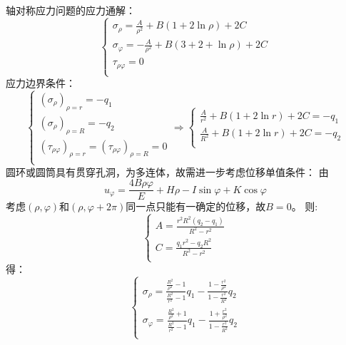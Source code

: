 	\begin{remark}
		轴对称应力问题的应力通解：
		\begin{equation*}
			\begin{cases}
			\sigma _{\rho}=\frac{A}{\rho ^2}+B\left( 1+2\ln \rho \right) +2C\\
			\sigma _{\varphi}=-\frac{A}{\rho ^2}+B\left( 3+2+\ln \rho \right) +2C\\
			\tau _{\rho \varphi}=0\\
			\end{cases}
		\end{equation*}
		应力边界条件：
		\begin{equation*}
			\begin{cases}
			\left( \sigma _{\rho} \right) _{\rho =r}=-q_1\\
			\left( \sigma _{\rho} \right) _{\rho =R}=-q_2\\
			\left( \tau _{\rho \varphi} \right) _{\rho =r}=\left( \tau _{\rho \varphi} \right) _{\rho =R}=0\\
			\end{cases}\Longrightarrow \left\{ \begin{array}{c}
			\frac{A}{r^2}+B\left( 1+2\ln r \right) +2C=-q_1\\
			\frac{A}{R^2}+B\left( 1+2\ln r \right) +2C=-q_2\\
			\end{array} \right. 
		\end{equation*}
		圆环或圆筒具有贯穿孔洞，为多连体，故需进一步考虑位移单值条件：
		由\[u_{\varphi}=\frac{4B\rho \varphi}{E}+H\rho -I\sin \varphi +K\cos \varphi \]
		考虑$\left( \rho ,\varphi \right) \text{和}\left( \rho ,\varphi +2\pi \right) $同一点只能有一确定的位移，故$B=0$。
		则:\[\begin{cases}
		A=\frac{r^2R^2\left( q_2-q_1 \right)}{R^2-r^2}\\
		C=\frac{q_1r^2-q_2R^2}{R^2-r^2}\\
		\end{cases}\]
		得：\[\begin{cases}
		\sigma _{\rho}=\frac{\frac{R^2}{\rho ^2}-1}{\frac{R^2}{r^2}-1}q_1-\frac{1-\frac{r^2}{\rho ^2}}{1-\frac{r^2}{R^2}}q_2\\
		\sigma _{\varphi}=\frac{\frac{R^2}{\rho ^2}+1}{\frac{R^2}{r^2}-1}q_1-\frac{1+\frac{r^2}{\rho ^2}}{1-\frac{r^2}{R^2}}q_2\\
		\end{cases}\]
	\end{remark}

